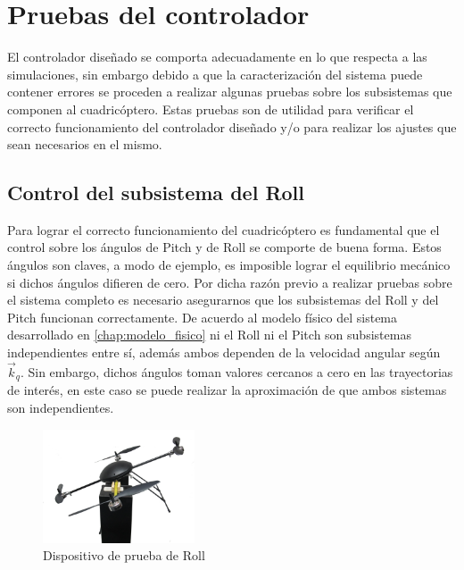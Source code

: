 \documentclass[main]{subfiles}
\begin{document}
\chapter{Pruebas del controlador}
El controlador diseñado se comporta adecuadamente en lo que respecta a las simulaciones, sin embargo debido a que la caracterizaci\'on del sistema puede contener errores se proceden a realizar algunas pruebas sobre los subsistemas que componen al cuadric\'optero. Estas pruebas son de utilidad para verificar el correcto funcionamiento del controlador diseñado y/o para realizar los ajustes que sean necesarios en el mismo.\\

\section{Control del subsistema del Roll}

Para lograr el correcto funcionamiento del cuadric\'optero es fundamental que el control sobre los \'angulos de Pitch y de Roll se comporte de buena forma. Estos \'angulos son claves, a modo de ejemplo, es imposible lograr el equilibrio mec\'anico si dichos \'angulos difieren de cero. Por dicha raz\'on previo a realizar pruebas sobre el sistema completo es necesario asegurarnos que los subsistemas del  Roll y del Pitch funcionan correctamente. De acuerdo al modelo f\'isico del sistema desarrollado en \ref{chap:modelo_fisico} ni el Roll ni el Pitch son subsistemas independientes entre s\'i, adem\'as ambos dependen de la velocidad angular seg\'un $\vec{k}_q$. Sin embargo, dichos \'angulos toman valores cercanos a cero en las trayectorias de inter\'es, en este caso se puede realizar la aproximaci\'on de que ambos sistemas son independientes.\\

\begin{figure}
	\vspace{-20pt}
	\centering
	\includegraphics[width=0.4\textwidth]{./pics_test_control/dispositivo_psi.pdf}
	\caption{Dispositivo de prueba de Roll}
	\label{fig:psidisp}
\end{figure}
\end{document}
